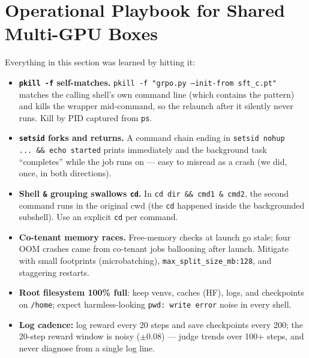 \documentclass[11pt]{article}
\begin{document}
\section{Operational Playbook for Shared Multi-GPU Boxes}
\label{sec:ops}
Everything in this section was learned by hitting it:
\begin{itemize}
\item \textbf{\texttt{pkill -f} self-matches.} \texttt{pkill -f
"grpo.py --init-from sft\_c.pt"} matches the calling shell's own command line
(which contains the pattern) and kills the wrapper mid-command, so the
relaunch after it silently never runs. Kill by PID captured from
\texttt{ps}.
\item \textbf{\texttt{setsid} forks and returns.} A command chain ending in
\texttt{setsid nohup ...\ \&\& echo started} prints immediately and the
background task ``completes'' while the job runs on --- easy to misread as a
crash (we did, once, in both directions).
\item \textbf{Shell \texttt{\&} grouping swallows \texttt{cd}.} In
\texttt{cd dir \&\& cmd1 \& cmd2}, the second command runs in the original
cwd (the \texttt{cd} happened inside the backgrounded subshell). Use an
explicit \texttt{cd} per command.
\item \textbf{Co-tenant memory races.} Free-memory checks at launch go stale;
four OOM crashes came from co-tenant jobs ballooning after launch. Mitigate
with small footprints (microbatching), \texttt{max\_split\_size\_mb:128}, and
staggering restarts.
\item \textbf{Root filesystem 100\% full}: keep venvs, caches (HF), logs, and
checkpoints on \texttt{/home}; expect harmless-looking \texttt{pwd: write
error} noise in every shell.
\item \textbf{Log cadence:} log reward every 20 steps and save checkpoints
every 200; the 20-step reward window is noisy ($\pm 0.08$) --- judge trends
over 100+ steps, and never diagnose from a single log line.
\end{itemize}
\end{document}

